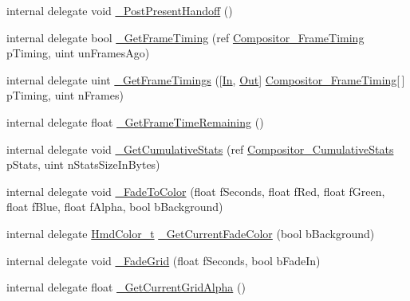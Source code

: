 \begin{DoxyCompactItemize}
internal delegate void \mbox{\hyperlink{struct_valve_1_1_v_r_1_1_i_v_r_compositor_a1897063eebdbc1ee4d4ae821a6d584cc}{\+\_\+\+Post\+Present\+Handoff}} ()
\item 
internal delegate bool \mbox{\hyperlink{struct_valve_1_1_v_r_1_1_i_v_r_compositor_a6346b53c57bb41157b6fa9946537b334}{\+\_\+\+Get\+Frame\+Timing}} (ref \mbox{\hyperlink{struct_valve_1_1_v_r_1_1_compositor___frame_timing}{Compositor\+\_\+\+Frame\+Timing}} p\+Timing, uint un\+Frames\+Ago)
\item 
internal delegate uint \mbox{\hyperlink{struct_valve_1_1_v_r_1_1_i_v_r_compositor_a136355380a2308c5dc9f690b1ca77c60}{\+\_\+\+Get\+Frame\+Timings}} (\mbox{[}\mbox{\hyperlink{namespace_valve_1_1_v_r_a1e6192cb5ddaf204afab87ccb5728780aefeb369cccbd560588a756610865664c}{In}}, \mbox{\hyperlink{namespace_valve_1_1_v_r_a1e6192cb5ddaf204afab87ccb5728780a7c147cda9e49590f6abe83d118b7353b}{Out}}\mbox{]} \mbox{\hyperlink{struct_valve_1_1_v_r_1_1_compositor___frame_timing}{Compositor\+\_\+\+Frame\+Timing}}\mbox{[}$\,$\mbox{]} p\+Timing, uint n\+Frames)
\item 
internal delegate float \mbox{\hyperlink{struct_valve_1_1_v_r_1_1_i_v_r_compositor_a946f8645a1cf6d6380064532df33d6d0}{\+\_\+\+Get\+Frame\+Time\+Remaining}} ()
\item 
internal delegate void \mbox{\hyperlink{struct_valve_1_1_v_r_1_1_i_v_r_compositor_a5b17db2366df6ea7d74ca5b03c9037d4}{\+\_\+\+Get\+Cumulative\+Stats}} (ref \mbox{\hyperlink{struct_valve_1_1_v_r_1_1_compositor___cumulative_stats}{Compositor\+\_\+\+Cumulative\+Stats}} p\+Stats, uint n\+Stats\+Size\+In\+Bytes)
\item 
internal delegate void \mbox{\hyperlink{struct_valve_1_1_v_r_1_1_i_v_r_compositor_ab967ee4e10a9344a4790c20786ed21c6}{\+\_\+\+Fade\+To\+Color}} (float f\+Seconds, float f\+Red, float f\+Green, float f\+Blue, float f\+Alpha, bool b\+Background)
\item 
internal delegate \mbox{\hyperlink{struct_valve_1_1_v_r_1_1_hmd_color__t}{Hmd\+Color\+\_\+t}} \mbox{\hyperlink{struct_valve_1_1_v_r_1_1_i_v_r_compositor_ae7afb03647118e23520b2b59de4c5ec4}{\+\_\+\+Get\+Current\+Fade\+Color}} (bool b\+Background)
\item 
internal delegate void \mbox{\hyperlink{struct_valve_1_1_v_r_1_1_i_v_r_compositor_a24abe64d80aceed84bdeabb788a8b683}{\+\_\+\+Fade\+Grid}} (float f\+Seconds, bool b\+Fade\+In)
\item 
internal delegate float \mbox{\hyperlink{struct_valve_1_1_v_r_1_1_i_v_r_compositor_af32ee4004d4955894735f00e6d4dfbe3}{\+\_\+\+Get\+Current\+Grid\+Alpha}} ()

\end{DoxyCompactItemize}
